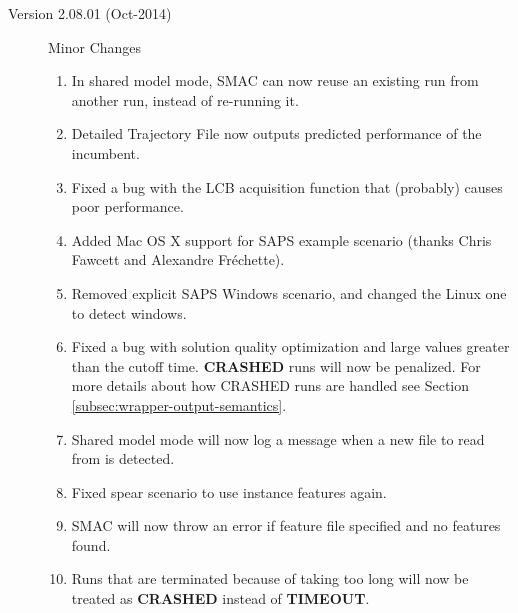 \documentclass[11pt,letterpaper,oneside]{article}
\begin{document}
\begin{description}
\begin{enumerate}
          	\end{enumerate}
		\item[Version 2.08.01 (Oct-2014)] Minor Changes
			\begin{enumerate}
				\item In shared model mode, SMAC can now reuse an existing run from another run, instead of re-running it.
				\item Detailed Trajectory File now outputs predicted performance of the incumbent.
				\item Fixed a bug with the LCB acquisition function that (probably) causes poor performance.
				\item Added Mac OS X support for SAPS example scenario (thanks Chris Fawcett and Alexandre Fr\'{e}chette).
				\item Removed explicit SAPS Windows scenario, and changed the Linux one to detect windows.
				\item Fixed a bug with solution quality optimization and large values greater than the cutoff time. \textbf{CRASHED} runs will now be penalized. For more details about how CRASHED runs are handled see Section \ref{subsec:wrapper-output-semantics}.
				\item Shared model mode will now log a message when a new file to read from is detected.
				\item Fixed spear scenario to use instance features again.
				\item SMAC will now throw an error if feature file specified and no features
				found.
				\item Runs that are terminated because of taking too long will now be treated as \textbf{CRASHED} instead of \textbf{TIMEOUT}.
			\end{enumerate}
           

	\end{description}
\end{document}

